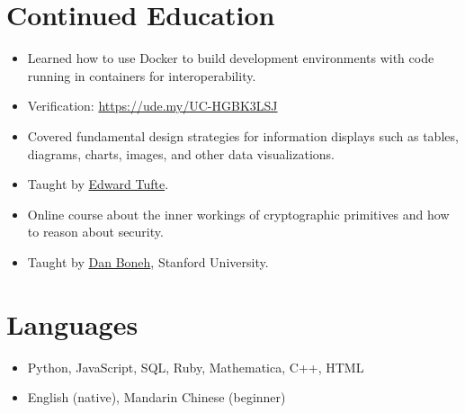 \documentclass{cultvoucher}
\begin{document}
\section{Continued Education}
\begin{itemize}
	\item Learned how to use Docker to build development environments with code
	      running in containers for interoperability.
	\item Verification: \url{https://ude.my/UC-HGBK3LSJ}
\end{itemize}
\begin{itemize}
	\item Covered fundamental design strategies for information displays
	      such as tables, diagrams, charts, images, and other data
	      visualizations.
	\item Taught by \href{https://www.edwardtufte.com/tufte/}{Edward Tufte}.
\end{itemize}
\begin{itemize}
	\item Online course about the inner workings of cryptographic primitives
	      and how to reason about security.
	\item Taught by \href{https://crypto.stanford.edu/~dabo/}{Dan Boneh}, Stanford University.
\end{itemize}

\section{Languages}
\begin{itemize}
	\item Python, JavaScript, SQL, Ruby, Mathematica, C++, HTML
	\item English (native), Mandarin Chinese (beginner)
\end{itemize}
\end{document}
